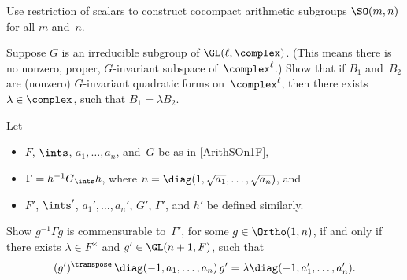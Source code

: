 \begin{exercises}
 
\item \label{CocpctSO}
 Use restriction of scalars  to
construct cocompact arithmetic subgroups $\SO(m,n)$ for
all $m$ and~$n$.

\item \label{QuadFormUnique}
 Suppose $G$ is an irreducible subgroup of
$\GL(\ell,\complex)$. (This means there is no nonzero, proper, $G$-invariant subspace of~$\complex^\ell$.) Show that if $B_1$ and~$B_2$ are (nonzero)
$G$-invariant quadratic forms on~$\complex^\ell$, then
there exists $\lambda \in \complex$, such that $B_1 = \lambda
B_2$.

\item \label{Gamma=Gamma'<>BEquiv}
 Let 
 	\begin{itemize}
	\item $F$, $\ints$, $a_1,\ldots,a_n$, and~$G$ be as in \cref{ArithSOn1F},
	\item $\Gamma = h^{-1} G_\ints h$, where $n = \diag(1, \sqrt{a_1}, \ldots,\sqrt{a_n})$, 
	and
	\item $F'$, $\ints'$, $a_1',\ldots,a_n'$, $G'$, $\Gamma'$, and $h'$ be defined similarly.
	\end{itemize}
Show $g^{-1} \Gamma g$ is commensurable to~$\Gamma'$, for some $g \in \Ortho(1,n)$,  if and only if there exists $\lambda \in F^\times$ and $g' \in \GL(n+1,F)$, such that
 $$ (g')^\transpose \, \diag(-1,a_1,\ldots,a_n) \, g'
 = \lambda \diag(-1,a'_1,\ldots,a'_n) .$$


\end{exercises}
